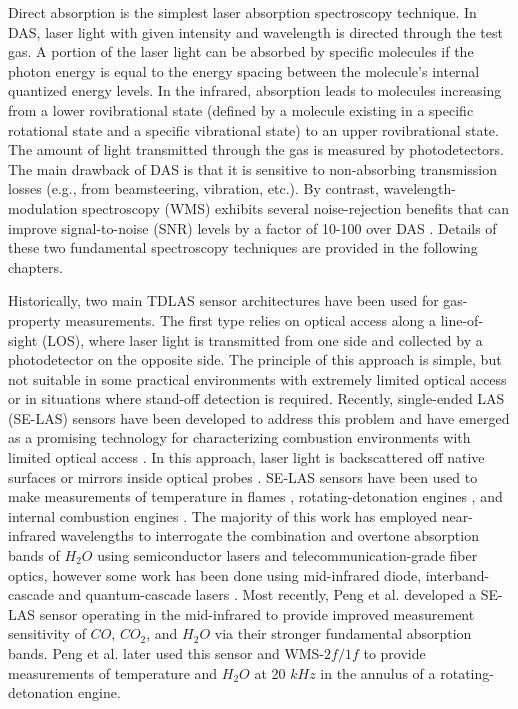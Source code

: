 Direct absorption is the simplest laser absorption spectroscopy technique. In DAS, laser light with given intensity and wavelength is directed through the test gas. A portion of the laser light can be absorbed by specific molecules if the photon energy is equal to the energy spacing between the molecule's internal quantized energy levels. In the infrared, absorption leads to molecules increasing from a lower rovibrational state (defined by a molecule existing in a specific rotational state and a specific vibrational state) to an upper rovibrational state. The amount of light transmitted through the gas is measured by photodetectors. The main drawback of DAS is that it is sensitive to non-absorbing transmission losses (e.g., from beamsteering, vibration, etc.). By contrast, wavelength-modulation spectroscopy (WMS) exhibits several noise-rejection benefits that can improve signal-to-noise (SNR) levels by a factor of 10-100 over DAS \cite{Rieker2009b}. Details of these two fundamental spectroscopy techniques are provided in the following chapters.

Historically, two main TDLAS sensor architectures have been used for gas-property measurements. The first type relies on optical access along a line-of-sight (LOS), where laser light is transmitted from one side and collected by a photodetector on the opposite side. The principle of this approach is simple, but not suitable in some practical environments with extremely limited optical access or in situations where stand-off detection is required. Recently, single-ended LAS (SE-LAS) sensors have been developed to address this problem and have emerged as a promising technology for characterizing combustion environments with limited optical access \cite{Goldenstein2017}. In this approach, laser light is backscattered off native surfaces \cite{Dubinsky1998, Wainner2002, Wang2015, Goldenstein:16, Peng:16, Peng2018} or mirrors inside optical probes \cite{RIEKER20073041, Rein:10, Chen2010, 0957-0233-25-11-115501, GIRARD2017158}. SE-LAS sensors have been used to make measurements of temperature in flames \cite{Goldenstein:16,Peng:16}, rotating-detonation engines \cite{Rein2017, Peng2018}, and internal combustion engines \cite{Melin2017}. The majority of this work has employed near-infrared wavelengths to interrogate the combination and overtone absorption bands of $H_2O$ using semiconductor lasers and telecommunication-grade fiber optics, however some work has been done using mid-infrared diode, interband-cascade and quantum-cascade lasers \cite{Peng2018, 0957-0233-25-11-115501, GIRARD2017158}. Most recently, Peng et al. \cite{Peng:16} developed a SE-LAS sensor operating in the mid-infrared to provide improved measurement sensitivity of $CO$, $CO_2$, and $H_2O$ via their stronger fundamental absorption bands. Peng et al. \cite{Peng2018} later used this sensor and WMS-$2f/1f$ to provide measurements of temperature and $H_2O$ at 20 $kHz$ in the annulus of a rotating-detonation engine.

